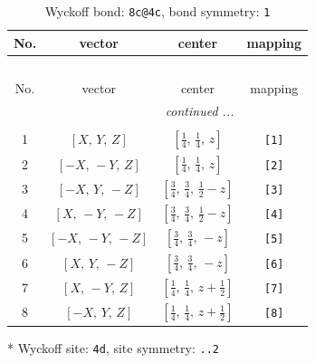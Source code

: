 \documentclass[fleqn,8pt]{jsarticle}
\begin{document}
\begin{longtable}{cccc}
\caption{Wyckoff bond: {\tt 8c@4c}, bond symmetry: {\tt 1}}
 \\
 \hline \hline
No. & vector & center & mapping \\ \hline \endfirsthead

\multicolumn{3}{l}{\tablename\ \thetable{}} \\
 \hline \hline
No. & vector & center & mapping \\ \hline \endhead

 \hline \hline
\multicolumn{3}{r}{\footnotesize\it continued ...} \\ \endfoot

 \hline \hline
\multicolumn{3}{r}{} \\ \endlastfoot

1 & $\left[ X,\, Y,\, Z \right]$ & $\left[ \frac{1}{4},\, \frac{1}{4},\, z \right]$ & {\tt [1]} \\ \hline
2 & $\left[ - X,\, - Y,\, Z \right]$ & $\left[ \frac{1}{4},\, \frac{1}{4},\, z \right]$ & {\tt [2]} \\ \hline
3 & $\left[ - X,\, Y,\, - Z \right]$ & $\left[ \frac{3}{4},\, \frac{3}{4},\, \frac{1}{2} - z \right]$ & {\tt [3]} \\ \hline
4 & $\left[ X,\, - Y,\, - Z \right]$ & $\left[ \frac{3}{4},\, \frac{3}{4},\, \frac{1}{2} - z \right]$ & {\tt [4]} \\ \hline
5 & $\left[ - X,\, - Y,\, - Z \right]$ & $\left[ \frac{3}{4},\, \frac{3}{4},\, - z \right]$ & {\tt [5]} \\ \hline
6 & $\left[ X,\, Y,\, - Z \right]$ & $\left[ \frac{3}{4},\, \frac{3}{4},\, - z \right]$ & {\tt [6]} \\ \hline
7 & $\left[ X,\, - Y,\, Z \right]$ & $\left[ \frac{1}{4},\, \frac{1}{4},\, z + \frac{1}{2} \right]$ & {\tt [7]} \\ \hline
8 & $\left[ - X,\, Y,\, Z \right]$ & $\left[ \frac{1}{4},\, \frac{1}{4},\, z + \frac{1}{2} \right]$ & {\tt [8]} \\
\end{longtable}
* Wyckoff site: {\tt 4d}, site symmetry: {\tt ..2}
\renewcommand{\arraystretch}{1.2}
\end{document}
